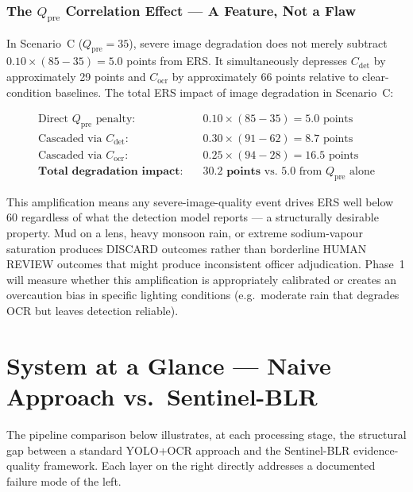 \documentclass[11pt,a4paper]{article}
\begin{document}
\subsubsection*{The $Q_{\text{pre}}$ Correlation Effect — A Feature, Not a Flaw}

In Scenario~C ($Q_{\text{pre}} = 35$), severe image degradation does not merely subtract $0.10 \times (85 - 35) = 5.0$ points from ERS. It simultaneously depresses $C_{\text{det}}$ by approximately 29 points and $C_{\text{ocr}}$ by approximately 66 points relative to clear-condition baselines. The total ERS impact of image degradation in Scenario~C:

\begin{align*}
\text{Direct } Q_{\text{pre}} \text{ penalty:}& \quad 0.10 \times (85 - 35) = 5.0 \text{ points} \\
\text{Cascaded via } C_{\text{det}}:& \quad 0.30 \times (91 - 62) = 8.7 \text{ points} \\
\text{Cascaded via } C_{\text{ocr}}:& \quad 0.25 \times (94 - 28) = 16.5 \text{ points} \\
\textbf{Total degradation impact:}& \quad \mathbf{30.2 \text{ points}} \text{ vs.\ 5.0 from } Q_{\text{pre}} \text{ alone}
\end{align*}

This amplification means any severe-image-quality event drives ERS well below 60 regardless of what the detection model reports --- a structurally desirable property. Mud on a lens, heavy monsoon rain, or extreme sodium-vapour saturation produces DISCARD outcomes rather than borderline HUMAN REVIEW outcomes that might produce inconsistent officer adjudication. Phase~1 will measure whether this amplification is appropriately calibrated or creates an overcaution bias in specific lighting conditions (e.g.\ moderate rain that degrades OCR but leaves detection reliable).

\section{System at a Glance — Naive Approach vs.\ Sentinel-BLR}
\label{sec:naive-vs-sentinel}

The pipeline comparison below illustrates, at each processing stage, the structural gap between a standard YOLO+OCR approach and the Sentinel-BLR evidence-quality framework. Each layer on the right directly addresses a documented failure mode of the left.
\end{document}

